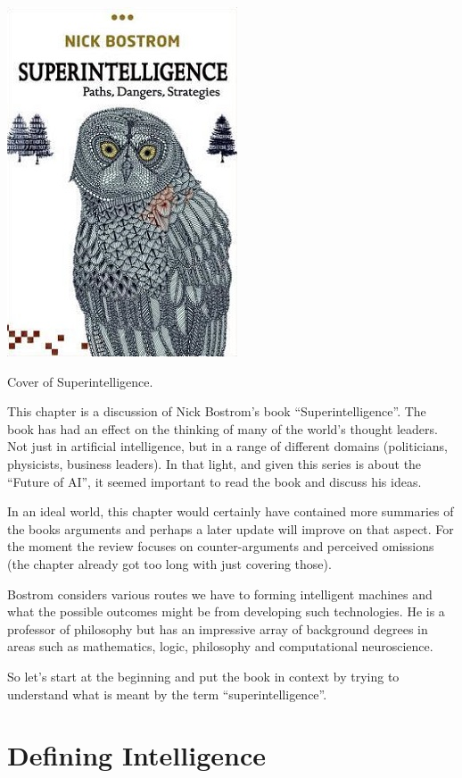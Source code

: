 \documentclass[a4paper]{caesar_book}
\begin{document}
\begin{marginfigure}%
    \includegraphics[width=\marginparwidth]{pictures/Superintelligence.jpg}%
    \caption*{Cover of Superintelligence.}
    \label{superintelligence}%
\end{marginfigure}%

This chapter is a discussion of Nick Bostrom’s book “Superintelligence”. The book has had an effect on the thinking of many of the world’s thought leaders. Not just in artificial intelligence, but in a range of different domains (politicians, physicists, business leaders). In that light, and given this series is about the ``Future of AI'', it seemed important to read the book and discuss his ideas.

In an ideal world, this chapter would certainly have contained more summaries of the books arguments and perhaps a later update will improve on that aspect. For the moment the review focuses on counter-arguments and perceived omissions (the chapter already got too long with just covering those).

Bostrom considers various routes we have to forming intelligent machines and what the possible outcomes might be from developing such technologies. He is a professor of philosophy but has an impressive array of background degrees in areas such as mathematics, logic, philosophy and computational neuroscience.

So let’s start at the beginning and put the book in context by trying to understand what is meant by the term “superintelligence”.

\section{Defining Intelligence}
\end{document}
